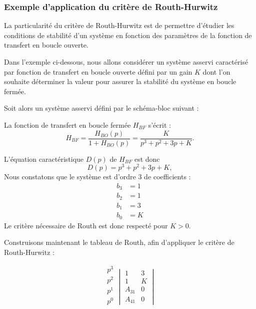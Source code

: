 \subsubsection{Exemple d'application du critère de Routh-Hurwitz}

La particularité du critère de Routh-Hurwitz est de permettre d'étudier les conditions
de stabilité d'un système en fonction des paramètres de la fonction de 
transfert en boucle ouverte.

Dans l'exemple ci-dessous, nous allons considérer un système asservi caractérisé 
par fonction de transfert en boucle ouverte défini par un gain $K$
dont l'on souhaite déterminer la valeur pour assurer la stabilité du système en boucle fermée.


Soit alors un système asservi défini par le schéma-bloc suivant :
\begin{center}
\end{center}

La fonction de transfert en boucle fermée $H_{BF}$ s'écrit :
$$
H_{BF}=\dfrac{H_{BO}(p)}{1+H_{BO}(p)}=\dfrac{K}{p^3+p^2+3p+K}.
$$

L'équation caractéristique $D(p)$ de $H_{BF}$ est donc 
$$
D(p)=p^3+p^2+3p+K,
$$
Nous constatons que le système est d'ordre 3 de coefficients :
\begin{align*}
    b_3&=1\\
    b_2&=1\\
    b_1&=3\\
    b_0&=K
\end{align*}
Le critère nécessaire de Routh est donc respecté pour $K>0$.


Construisons maintenant le tableau de Routh, afin d'appliquer le critère de Routh-Hurwitz :

\[
\begin{matrix}
    p^3 \\
    p^2 \\
    \hline
    p^1 \\
    p^0 \\
\end{matrix}
\begin{vmatrix}
     1      & 3  \\
     1      & K  \\
    \hline
    A_{31}  & 0  \\
    A_{41}  & 0    
    \end{vmatrix}
\]

